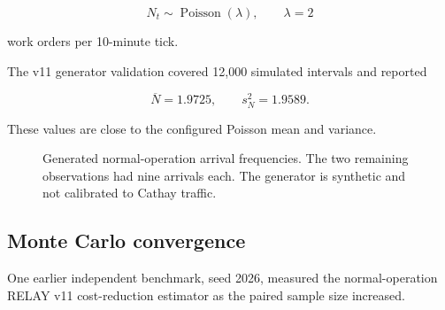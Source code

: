 \documentclass[10pt,a4paper]{article}
\theoremstyle{plain}
\theoremstyle{definition}
\theoremstyle{remark}
\begin{document}
\begin{equation}
N_t\sim\operatorname{Poisson}(\lambda),
\qquad
\lambda=2
\end{equation}

work orders per 10-minute tick.

The v11 generator validation covered
12,000 simulated intervals and reported

\[
\overline N=1.9725,
\qquad
s_N^2=1.9589.
\]

These values are close to the
configured Poisson mean and variance.

\begin{figure}[!htbp]
\centering


\caption{
Generated normal-operation arrival
frequencies.
The two remaining observations had
nine arrivals each.
The generator is synthetic and
not calibrated to Cathay traffic.
}
\label{fig:arrival}
\end{figure}

\subsection{Monte Carlo convergence}

One earlier independent benchmark,
seed 2026, measured the normal-operation
RELAY v11 cost-reduction estimator
as the paired sample size increased.
\end{document}
